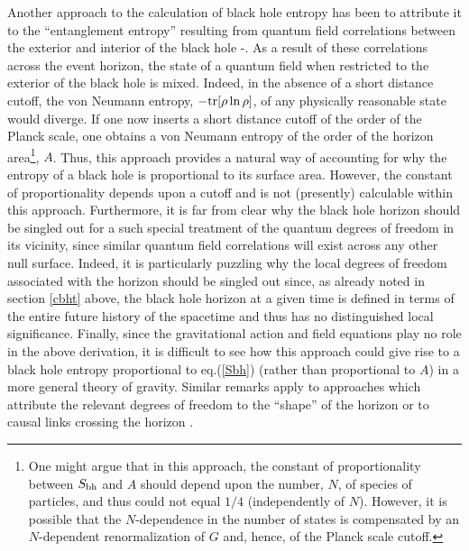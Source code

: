 Another approach to the calculation of black hole entropy has been to
attribute it to the ``entanglement entropy'' resulting from quantum
field correlations between the exterior and interior of the black hole
\cite{bkls}-\cite{hlw}.  As a result of these correlations across the
event horizon, the state of a quantum field when restricted to the
exterior of the black hole is mixed. Indeed, in the absence of a short
distance cutoff, the von Neumann entropy, $- {\rm tr} [{\rho} \ln
{\rho}]$, of any physically reasonable state would diverge. If one now
inserts a short distance cutoff of the order of the Planck scale, one
obtains a von Neumann entropy of the order of the horizon
area\footnote{One might argue that in this approach, the constant of
proportionality between $S_{\rm bh}$ and $A$ should depend upon the
number, $N$, of species of particles, and thus could not equal $1/4$
(independently of $N$). However, it is possible that the
$N$-dependence in the number of states is compensated by an
$N$-dependent renormalization of $G$ \cite{su} and, hence, of the
Planck scale cutoff.}, $A$. Thus, this approach provides a natural way
of accounting for why the entropy of a black hole is proportional to
its surface area. However, the constant of proportionality depends
upon a cutoff and is not (presently) calculable within this
approach. Furthermore, it is far from clear why the black hole horizon
should be singled out for a such special treatment of the quantum
degrees of freedom in its vicinity, since similar quantum field
correlations will exist across any other null surface. Indeed, it is
particularly puzzling why the local degrees of freedom associated with
the horizon should be singled out since, as already noted in section
\ref{cbht} above, the black hole horizon at a given time is defined in
terms of the entire future history of the spacetime and thus has no
distinguished local significance. Finally, since the gravitational
action and field equations play no role in the above derivation, it is
difficult to see how this approach could give rise to a black hole
entropy proportional to eq.(\ref{Sbh}) (rather than proportional to
$A$) in a more general theory of gravity. Similar remarks apply to
approaches which attribute the relevant degrees of freedom to the
``shape'' of the horizon \cite{sork} or to causal links crossing the
horizon \cite{dou}.

